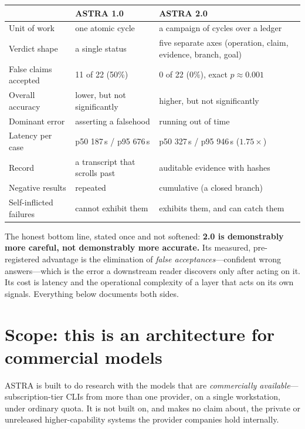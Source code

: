 \documentclass[11pt,a4paper]{article}
\newcommand{\viol}[1]{\textcolor{astrared}{#1}}
\newcommand{\okk}[1]{\textcolor{astragreen}{#1}}
\begin{document}
\begin{center}
\small
\begin{tabular}{@{}p{4.3cm}p{4.9cm}p{4.9cm}@{}}
\toprule
 & \textbf{ASTRA 1.0} & \textbf{ASTRA 2.0} \\
\midrule
Unit of work & one atomic cycle & a campaign of cycles over a ledger \\
Verdict shape & a single status & five separate axes (operation, claim, evidence, branch, goal) \\
False claims accepted & 11 of 22 (\viol{50\%}) & 0 of 22 (\okk{0\%}), exact $p\approx0.001$ \\
Overall accuracy & lower, but not significantly & higher, but not significantly \\
Dominant error & asserting a falsehood & running out of time \\
Latency per case & p50 187\,s / p95 676\,s & p50 327\,s / p95 946\,s ($1.75\times$) \\
Record & a transcript that scrolls past & auditable evidence with hashes \\
Negative results & repeated & cumulative (a closed branch) \\
Self-inflicted failures & cannot exhibit them & exhibits them, and can catch them \\
\bottomrule
\end{tabular}
\end{center}

\noindent The honest bottom line, stated once and not softened: \textbf{2.0 is
demonstrably more careful, not demonstrably more accurate.} Its measured, pre-
registered advantage is the elimination of \emph{false acceptances}---confident
wrong answers---which is the error a downstream reader discovers only after acting
on it. Its cost is latency and the operational complexity of a layer that acts on
its own signals. Everything below documents both sides.

\section{Scope: this is an architecture for commercial models}
\label{sec:scope}

ASTRA is built to do research with the models that are \emph{commercially
available}---subscription-tier CLIs from more than one provider, on a single
workstation, under ordinary quota. It is not built on, and makes no claim about,
the private or unreleased higher-capability systems the provider companies hold
internally.
\end{document}
